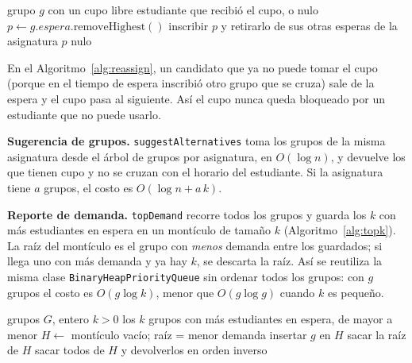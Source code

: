 \documentclass[conference]{IEEEtran}
\begin{document}
\begin{algorithm}[htbp]
\caption{Reasignar un cupo liberado (\texttt{reassignSeat})}
\label{alg:reassign}
\begin{algorithmic}[1]
\Require grupo $g$ con un cupo libre
\Ensure estudiante que recibió el cupo, o nulo
    \State $p \gets g.\mathit{espera}.\mathrm{removeHighest}()$ 
     
        \State inscribir $p$ y retirarlo de sus otras esperas de la asignatura
        \State \Return $p$
    \EndIf
\EndWhile
\State \Return nulo
\end{algorithmic}
\end{algorithm}

En el Algoritmo~\ref{alg:reassign}, un candidato que ya no puede tomar el cupo (porque en el tiempo de espera inscribió otro grupo que se cruza) sale de la espera y el cupo pasa al siguiente. Así el cupo nunca queda bloqueado por un estudiante que no puede usarlo.

\textbf{Sugerencia de grupos.} \texttt{suggestAlternatives} toma los grupos de la misma asignatura desde el árbol de grupos por asignatura, en $O(\log n)$, y devuelve los que tienen cupo y no se cruzan con el horario del estudiante. Si la asignatura tiene $a$ grupos, el costo es $O(\log n + a\,k)$.

\textbf{Reporte de demanda.} \texttt{topDemand} recorre todos los grupos y guarda los $k$ con más estudiantes en espera en un montículo de tamaño $k$ (Algoritmo~\ref{alg:topk}). La raíz del montículo es el grupo con \emph{menos} demanda entre los guardados; si llega uno con más demanda y ya hay $k$, se descarta la raíz. Así se reutiliza la misma clase \texttt{BinaryHeapPriorityQueue} sin ordenar todos los grupos: con $g$ grupos el costo es $O(g \log k)$, menor que $O(g \log g)$ cuando $k$ es pequeño.

\begin{algorithm}[htbp]
\caption{Los $k$ grupos con más demanda (\texttt{topDemand})}
\label{alg:topk}
\begin{algorithmic}[1]
\Require grupos $G$, entero $k > 0$
\Ensure los $k$ grupos con más estudiantes en espera, de mayor a menor
\State $H \gets$ montículo vacío; raíz = menor demanda
    \State insertar $g$ en $H$ 
     \State sacar la raíz de $H$  \EndIf
\EndFor
\State sacar todos de $H$ y devolverlos en orden inverso
\end{algorithmic}
\end{algorithm}
\end{document}
